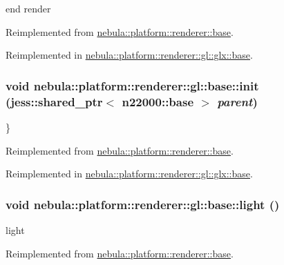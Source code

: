 end render 

Reimplemented from \hyperlink{classnebula_1_1platform_1_1renderer_1_1base_aa3caace8ed843895f841504742150d7a}{nebula::platform::renderer::base}.

Reimplemented in \hyperlink{classnebula_1_1platform_1_1renderer_1_1gl_1_1glx_1_1base_aaf176ccae80229814c17536d2c9aa24e}{nebula::platform::renderer::gl::glx::base}.\hypertarget{classnebula_1_1platform_1_1renderer_1_1gl_1_1base_affa88173c0ac23d9245a9addd721488b}{
\subsubsection[{init}]{\setlength{\rightskip}{0pt plus 5cm}void nebula::platform::renderer::gl::base::init (jess::shared\_\-ptr$<$ {\bf n22000::base} $>$ {\em parent})}}
\label{classnebula_1_1platform_1_1renderer_1_1gl_1_1base_affa88173c0ac23d9245a9addd721488b}


\} 

Reimplemented from \hyperlink{classnebula_1_1platform_1_1renderer_1_1base_aa7d53dc81000acba49cc90519674f909}{nebula::platform::renderer::base}.

Reimplemented in \hyperlink{classnebula_1_1platform_1_1renderer_1_1gl_1_1glx_1_1base_a08357ff32222b7e316db783de5755a2e}{nebula::platform::renderer::gl::glx::base}.\hypertarget{classnebula_1_1platform_1_1renderer_1_1gl_1_1base_a05d47dc08e518dca1f1f6940dd25b1d4}{
\subsubsection[{light}]{\setlength{\rightskip}{0pt plus 5cm}void nebula::platform::renderer::gl::base::light ()}}
\label{classnebula_1_1platform_1_1renderer_1_1gl_1_1base_a05d47dc08e518dca1f1f6940dd25b1d4}


light 

Reimplemented from \hyperlink{classnebula_1_1platform_1_1renderer_1_1base_af5a83a10b4c0b04997997f3337b49bd6}{nebula::platform::renderer::base}.

